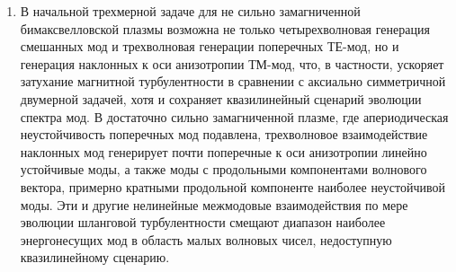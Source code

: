 \begin{enumerate}
    \item В начальной трехмерной задаче для не сильно замагниченной бимаксвелловской плазмы возможна не только четырехволновая генерация смешанных мод и трехволновая генерации поперечных ТЕ-мод, но и генерация наклонных к оси анизотропии ТМ-мод, что, в частности, ускоряет затухание магнитной турбулентности в сравнении с аксиально симметричной двумерной задачей, хотя и сохраняет квазилинейный сценарий эволюции спектра мод. В достаточно сильно замагниченной плазме, где апериодическая неустойчивость поперечных мод подавлена, трехволновое взаимодействие наклонных мод генерирует почти поперечные к оси анизотропии линейно устойчивые моды, а также моды с продольными компонентами волнового вектора, примерно кратными продольной компоненте наиболее неустойчивой моды. Эти и другие нелинейные межмодовые взаимодействия по мере эволюции шланговой турбулентности смещают диапазон наиболее энергонесущих мод в область малых волновых чисел, недоступную квазилинейному сценарию.

\end{enumerate}
